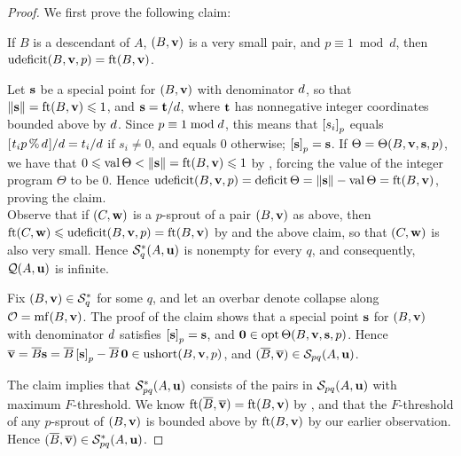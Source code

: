 \documentclass{amsart}
\begin{document}
\begin{proof}
We first prove the following claim:

\begin{claim}
   If $B$ is a descendant of $A$, $(B, \mathbf{v})$ is a very small pair, and $p \equiv 1 \bmod d$, then $\operatorname{udeficit}(B, \mathbf{v}, p) = \operatorname{ft}(B, \mathbf{v})$.
\end{claim}

Let $\mathbf{s}$ be a special point for $(B, \mathbf{v})$ with denominator $d$, so that $\| \mathbf{s} \| = \operatorname{ft}(B, \mathbf{v}) \leqslant 1$, and $\mathbf{s} = \mathbf{t}/d$, where $\mathbf{t}$ has nonnegative integer coordinates bounded above by $d$.
Since $p \equiv 1 \bmod d$, this means that $\left[ s_i \right]_p$ equals $[ \hspace{.01in} t_i p \, \% \, d \hspace{.01in} ]/d = t_i/d$ if $s_i \neq 0$, and equals $0$ otherwise; \ie $\left[ \mathbf{s} \right]_p = \mathbf{s}$.
If $\Theta = \Theta(B, \mathbf{v}, \mathbf{s}, p)$, we have that $0 \leqslant \operatorname{val} \Theta < \| \mathbf{s} \| = \operatorname{ft}(B, \mathbf{v}) \leqslant 1$  by , forcing the value of the integer program $\Theta$ to be $0$.
Hence $\operatorname{udeficit}(B, \mathbf{v}, p) = \operatorname{deficit} \Theta = \| \mathbf{s} \| - \operatorname{val}\Theta = \operatorname{ft}(B, \mathbf{v})$, proving the claim.\\[2mm]
Observe that if $(C, \mathbf{w})$ is a $p$-sprout of a pair $(B, \mathbf{v})$ as above, then $\operatorname{ft}(C, \mathbf{w}) \leqslant \operatorname{udeficit}(B, \mathbf{v}, p) = \operatorname{ft}(B, \mathbf{v})$ by  and the above claim, so that $(C, \mathbf{w})$ is also very small.
Hence $\mathcal{S}^\ast_{q}(A, \mathbf{u})$ is nonempty for every $q$, and consequently, $\mathcal{Q}(A,\mathbf{u})$ is infinite.

Fix $(B, \mathbf{v}) \in \mathcal{S}_{q}^\ast$ for some $q$, and let an overbar denote collapse along $\mathcal{O} = \operatorname{mf}(B, \mathbf{v})$.
The proof of the claim shows that a special point $\mathbf{s}$ for $(B,\mathbf{v})$ with denominator $d$ satisfies $\left[ \mathbf{s} \right]_p = \mathbf{s}$, and $\mathbf{0} \in \operatorname{opt} \Theta(B,\mathbf{v},\mathbf{s},p)$.
Hence $\overline{\mathbf{v}} = \overline{B}\mathbf{s} = \overline{B}\left[ \mathbf{s} \right]_p - \overline{B} \, \mathbf{0} \in \operatorname{ushort}(B, \mathbf{v}, p)$, and $(\overline{B}, \overline{\mathbf{v}}) \in \mathcal{S}_{pq}(A, \mathbf{u})$.

The claim implies that $\mathcal{S}^\ast_{pq}(A, \mathbf{u})$ consists of the pairs in $\mathcal{S}_{pq}(A, \mathbf{u})$ with maximum $F$-threshold.
We know $\operatorname{ft}(\overline{B}, \overline{\mathbf{v}}) = \operatorname{ft}(B, \mathbf{v})$ by , and
that the $F$-threshold of any $p$-sprout of $(B, \mathbf{v})$ is bounded above by $\operatorname{ft}(B, \mathbf{v})$ by our earlier observation.
Hence $(\overline{B}, \overline{\mathbf{v}}) \in \mathcal{S}^\ast_{pq}(A, \mathbf{u})$.


\end{proof}
\end{document}
